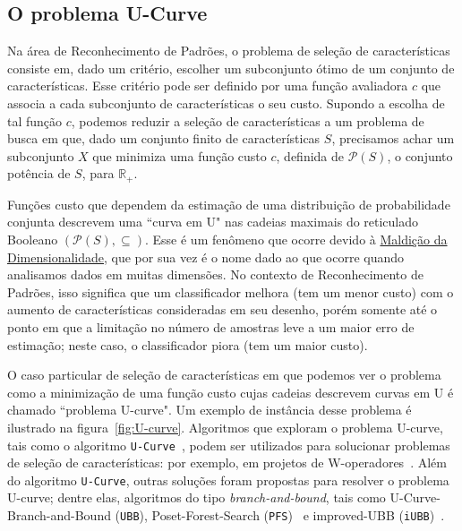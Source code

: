 \documentclass[12pt]{article}
\begin{document}
\subsection{O problema U-Curve}
Na área de Reconhecimento de Padrões, o problema de seleção de características consiste em, dado um critério, escolher um subconjunto ótimo de um conjunto de características. Esse critério pode ser definido por uma função avaliadora \begin{math}c\end{math} que associa a cada subconjunto de características o seu custo. Supondo a escolha de tal função \begin{math}c\end{math}, podemos reduzir a seleção de características a um problema de busca em que, dado um conjunto finito de características \begin{math}S\end{math}, precisamos achar um subconjunto \begin{math}X\end{math} que minimiza uma função custo \begin{math}c\end{math}, definida de $\mathcal{P}$\begin{math}(S)\end{math}, o conjunto potência de \begin{math}S\end{math},  para $\mathbb{R_+}$.

Funções custo que dependem da estimação de uma distribuição de probabilidade conjunta descrevem uma ``curva em U" nas cadeias maximais do reticulado Booleano $(\mathcal{P}(S),\subseteq)$. Esse é um fenômeno que ocorre devido à \href{http://en.wikipedia.org/wiki/Curse\_of\_dimensionality}{Maldição da Dimensionalidade}, que por sua vez é o nome dado ao que ocorre quando analisamos dados em muitas dimensões. No contexto de Reconhecimento de Padrões, isso significa que um classificador melhora (tem um menor custo) com o aumento de características consideradas em seu desenho, porém somente até o ponto em que a limitação no número de amostras leve a um maior erro de estimação; neste caso, o classificador piora (tem um maior custo). 

O caso particular de seleção de características em que podemos ver o problema como a minimização de uma função custo cujas cadeias descrevem curvas em U é chamado ``problema U-curve". Um exemplo de instância desse problema é ilustrado na figura~\ref{fig:U-curve}.
Algoritmos que exploram o problema U-curve, tais como o algoritmo {\tt U-Curve}~\cite{u-curve algorithm}, podem ser utilizados para solucionar problemas de seleção de características: por exemplo, em projetos de W-operadores~\cite{u-curve algorithm}. Além do algoritmo {\tt U-Curve}, outras soluções foram propostas para resolver o problema U-curve; dentre elas, algoritmos do tipo \emph{branch-and-bound}, tais como U-Curve-Branch-and-Bound ({\tt UBB}), Poset-Forest-Search ({\tt PFS})~\cite{msreis thesis} e improved-UBB ({\tt iUBB})~\cite{iubb}.
\end{document}
